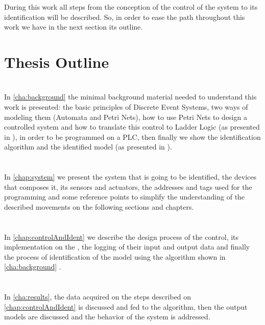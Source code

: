 During this work all steps from the conception of the control of the system to
its identification will be described. So, in order to ease the path throughout
this work we have in the next section its outline.

\section{Thesis Outline}
\label{sec:thesisOutline}

\paragraph{} ~\\
In \autoref{cha:background} the minimal background material needed to understand
this work is presented: the basic principles of Discrete Event Systems, two
ways of modeling them (Automata and Petri Nets), how to use Petri Nets to design
a controlled system and how to translate this control to Ladder Logic (as
presented in \cite{moreira2013bridging}), in order to be programmed on a PLC,
then finally we show the identification algorithm and the identified model
\DAOCT (as presented in \cite{moreira2018enhanced}).

\paragraph{} ~\\
In \autoref{chap:system} we present the system that is going to be identified,
the devices that composes it, its sensors and actuators, the addresses and tags
used for the programming and some reference points to simplify the understanding
of the described movements on the following sections and chapters.


\paragraph{} ~\\
In \autoref{chap:controlAndIdent} we describe the design process of the control,
its implementation on the \PLCs, the logging of their input and output data and
finally the process of identification of the model using the algorithm shown in
\autoref{cha:background} .

\paragraph{} ~\\
In \autoref{cha:results}, the data acquired on the steps described on
\autoref{chap:controlAndIdent} is discussed and fed to the algorithm, then the
output models are discussed and the behavior of the system is addressed.


